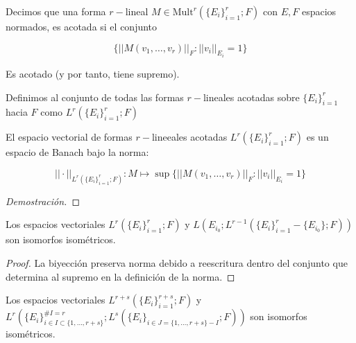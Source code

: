 \begin{defn}
	Decimos que una forma $r-$lineal $M\in \text{Mult}^r(\{E_i\}_{i =1}^r;F)$ con $E,F$ espacios normados,  es acotada si el conjunto 
	
	\begin{equation*}
		\{||M(v_1,\dots,v_r)||_F : ||v_i||_{E_i} = 1 \}
	\end{equation*}
	
	Es acotado (y por tanto, tiene supremo).
	
	Definimos al conjunto de todas las formas $r-$lineales acotadas sobre $\{E_i\}_{i =1}^r$ hacia $F$ como $L^r(\{E_i\}_{i =1}^r;F)$    
\end{defn}

\begin{prop}[$L^r$ Banach]
	El espacio vectorial de formas $r-$lineeales acotadas $L^r(\{E_i\}_{i =1}^r;F)$ es un espacio de Banach bajo la norma:
	
	\begin{equation*}
		||\cdot||_{L^r(\{E_i\}_{i =1}^r;F)}:M \mapsto \sup \{||M(v_1,\dots,v_r)||_F : ||v_i||_{E_i} = 1 \}
	\end{equation*}
\end{prop}

\begin{proof}[Demostración]
	
\end{proof}


\begin{prop}[$L^r(\{E_i\}_{i =1}^r;F) \cong L(E_{i_0} ; L^{r-1}(\{E_i\}_{i =1}^r - \{E_{i_0}\} ; F))$]
	Los espacios vectoriales $L^r(\{E_i\}_{i =1}^r;F)$ y $L(E_{i_0} ; L^{r-1}(\{E_i\}_{i =1}^r - \{E_{i_0}\} ; F))$  son isomorfos isométricos.
\end{prop}

\begin{proof}
	La biyección preserva norma debido a reescritura dentro del conjunto que determina al supremo en la definición de la norma.
\end{proof}


\begin{cor}[$L^{r+s}(\{E_i\}_{i =1}^{r+s};F) \cong L^r(\{E_{i}\}_{i \in I\subset \{1,\dots, r+s\}}^{\#I = r} ; L^{s}(\{E_{i}\}_{i \in J = \{1,\dots, r+s\}- I} ; F))$]
	Los espacios vectoriales $L^{r+s}(\{E_i\}_{i =1}^{r+s};F)$ y $L^r(\{E_{i}\}_{i \in I\subset \{1,\dots, r+s\}}^{\#I = r} ; L^{s}(\{E_{i}\}_{i \in J = \{1,\dots, r+s\}- I} ; F))$  son isomorfos isométricos.
\end{cor}






